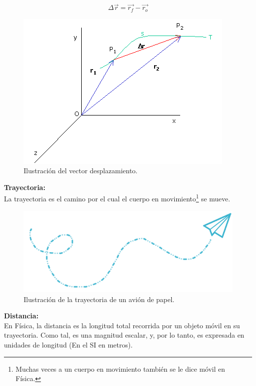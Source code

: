 \documentclass[a5paper,pagesize,10pt,bibtotoc,pointlessnumbers,
normalheadings,DIV=9,fleqn,x11names,table,twoside=false]{scrbook}
\begin{document}
\begin{equation}
 \Delta \vec{r} = \vec{r_f}-\vec{r_o}
\end{equation}

\begin{figure}[ht]
 \centering
 \includegraphics[scale=0.5]{images/cinematica.png}
 \caption{Ilustración del vector desplazamiento.}
\end{figure}

\textbf{Trayectoria:}\\

La trayectoria es el camino por el cual el cuerpo en movimiento\footnote{Muchas veces a un cuerpo en movimiento también se le 
dice móvil en Física.} se mueve.

\begin{figure}[ht]
 \centering
 \includegraphics[scale=0.4]{images/trayectoria.png}
 \caption{Ilustración de la trayectoria de un avión de papel.}
\end{figure}

\textbf{Distancia:}\\

En Física, la distancia es la longitud total recorrida por un objeto móvil en su trayectoria. Como tal, es una magnitud escalar, 
y, por lo tanto, es expresada en unidades de longitud (En el SI en metros).\\
\end{document}
